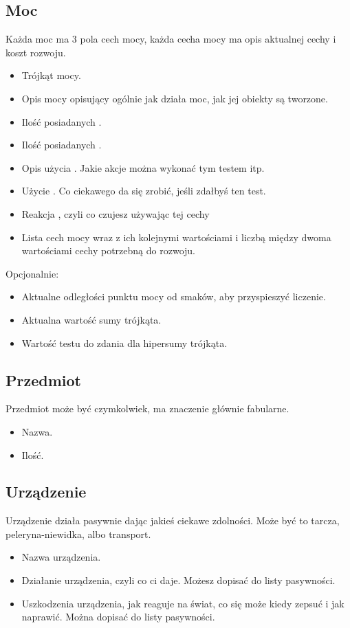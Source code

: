 \subsection{Moc}
Każda moc ma 3 pola cech mocy, każda cecha mocy ma opis aktualnej cechy i koszt rozwoju.
\begin{itemize} 
	\item Trójkąt mocy.
	\item Opis mocy opisujący ogólnie jak działa moc, jak jej obiekty są tworzone.
	\item Ilość posiadanych \xpmcn{}.
	\item Ilość posiadanych \abkar{}.
	\item Opis użycia \absm{}. Jakie akcje można wykonać tym testem itp.
	\item Użycie \abdm{}. Co ciekawego da się zrobić, jeśli zdałbyś ten test.
	\item Reakcja \abrm{}, czyli co czujesz używając tej cechy
	\item Lista cech mocy wraz z ich kolejnymi wartościami i liczbą \xpmcn{} między dwoma wartościami cechy potrzebną do rozwoju.
\end{itemize}
Opcjonalnie:
\begin{itemize}
	\item Aktualne odległości punktu mocy od smaków, aby przyspieszyć liczenie.
	\item Aktualna wartość sumy trójkąta.
	\item Wartość testu do zdania dla hipersumy trójkąta.
\end{itemize}


\subsection{Przedmiot}
Przedmiot może być czymkolwiek, ma znaczenie głównie fabularne.
\begin{itemize}
 \item Nazwa.
 \item Ilość.
\end{itemize}

\subsection{Urządzenie}
Urządzenie działa pasywnie dając jakieś ciekawe zdolności.
Może być to tarcza, peleryna-niewidka, albo transport.
\begin{itemize}
\item Nazwa urządzenia.
\item Działanie urządzenia, czyli co ci daje. Możesz dopisać do listy pasywności.
\item Uszkodzenia urządzenia, jak reaguje na świat, co się może kiedy zepsuć i jak naprawić. Można dopisać do listy pasywności.
\end{itemize}

